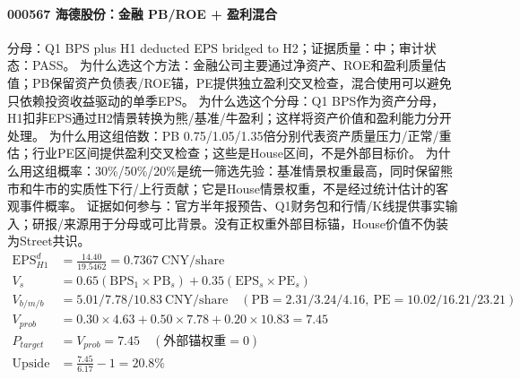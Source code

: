\paragraph{000567 海德股份：金融 PB/ROE + 盈利混合}
分母：Q1 BPS plus H1 deducted EPS bridged to H2；证据质量：中；审计状态：PASS。
为什么选这个方法：金融公司主要通过净资产、ROE和盈利质量估值；PB保留资产负债表/ROE锚，PE提供独立盈利交叉检查，混合使用可以避免只依赖投资收益驱动的单季EPS。
为什么选这个分母：Q1 BPS作为资产分母，H1扣非EPS通过H2情景转换为熊/基准/牛盈利；这样将资产价值和盈利能力分开处理。
为什么用这组倍数：PB 0.75/1.05/1.35倍分别代表资产质量压力/正常/重估；行业PE区间提供盈利交叉检查；这些是House区间，不是外部目标价。
为什么用这组概率：30\%/50\%/20\%是统一筛选先验：基准情景权重最高，同时保留熊市和牛市的实质性下行/上行贡献；它是House情景权重，不是经过统计估计的客观事件概率。
证据如何参与：官方半年报预告、Q1财务包和行情/K线提供事实输入；研报/来源用于分母或可比背景。没有正权重外部目标锚，House价值不伪装为Street共识。
\begin{align*}
\mathrm{EPS}_{H1}^d &= \frac{14.40}{19.5462} = 0.7367\ \mathrm{CNY/share}\\
V_s &= 0.65\left(\mathrm{BPS}_1\times \mathrm{PB}_s\right)+0.35\left(\mathrm{EPS}_s\times \mathrm{PE}_s\right)\\
V_{b/m/b} &= 5.01/7.78/10.83\ \mathrm{CNY/share}\quad(\mathrm{PB}=2.31/3.24/4.16,\ \mathrm{PE}=10.02/16.21/23.21)\\
V_{prob} &= 0.30\times 4.63+0.50\times 7.78+0.20\times 10.83=7.45\\
P_{target} &= V_{prob}=7.45\quad(\text{外部锚权重}=0)\\
\mathrm{Upside} &= \frac{7.45}{6.17}-1=20.8\%\\
\end{align*}

